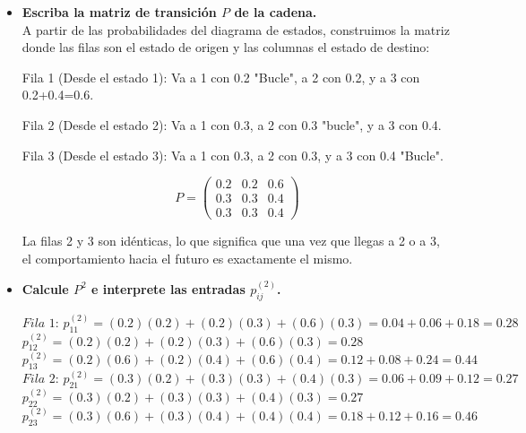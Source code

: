 \documentclass[10pt,a4paper]{book}
\begin{document}
\begin{itemize}
    \item[\textbf{a)}] \textbf{Escriba la matriz de transición $P$ de la cadena.} \\
    A partir de las probabilidades del diagrama de estados, construimos la matriz donde las filas son el estado de origen y las columnas el estado de destino:

\vspace{0.2cm}

Fila 1 (Desde el estado 1): Va a 1 con 0.2 "Bucle", a 2 con 0.2, y a 3 con 0.2+0.4=0.6.

Fila 2 (Desde el estado 2): Va a 1 con 0.3, a 2 con 0.3 "bucle", y a 3 con 0.4.

Fila 3 (Desde el estado 3): Va a 1 con 0.3, a 2 con 0.3, y a 3 con 0.4 "Bucle".

\vspace{0.2cm}

    \[ P = \begin{pmatrix} 0.2 & 0.2 & 0.6 \\ 0.3 & 0.3 & 0.4 \\ 0.3 & 0.3 & 0.4 \end{pmatrix} \]
    
\vspace{0.2cm}
    
La filas 2 y 3 son idénticas, lo que significa que una vez que llegas a 2 o a 3, el comportamiento hacia el futuro es exactamente el mismo.

    \item[\textbf{b)}] \textbf{Calcule $P^2$ e interprete las entradas $p_{ij}^{(2)}$.} 

    \(
    \textit{Fila 1: }p_{11}^{(2)} = (0.2)(0.2) + (0.2)(0.3) + (0.6)(0.3) = 0.04 + 0.06 + 0.18 = 0.28 
    \)\\
    \(
    p_{12}^{(2)} = (0.2)(0.2) + (0.2)(0.3) + (0.6)(0.3) = 0.28 
    \)\\
    \(
    p_{13}^{(2)} = (0.2)(0.6) + (0.2)(0.4) + (0.6)(0.4) = 0.12 + 0.08 + 0.24 = 0.44
    \)\\
    \(
    \textit{Fila 2: }p_{21}^{(2)} = (0.3)(0.2) + (0.3)(0.3) + (0.4)(0.3) = 0.06 + 0.09 + 0.12 = 0.27
    \)\\
    \(
     p_{22}^{(2)} = (0.3)(0.2) + (0.3)(0.3) + (0.4)(0.3) = 0.27
    \)\\
    \(
    p_{23}^{(2)} = (0.3)(0.6) + (0.3)(0.4) + (0.4)(0.4) = 0.18 + 0.12 + 0.16 = 0.46
    \)

    \vspace{0.2cm}
    

\end{itemize}
\end{document}

